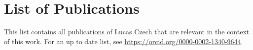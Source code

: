 
\cleardoublepage
\pagestyle{plain}

\chapter*{List of Publications}
\label{ch:Publications}

This list contains all publications of Lucas Czech that are relevant in the context of this work.
For an up to date list, see \url{https://orcid.org/0000-0002-1340-9644}.




% 

